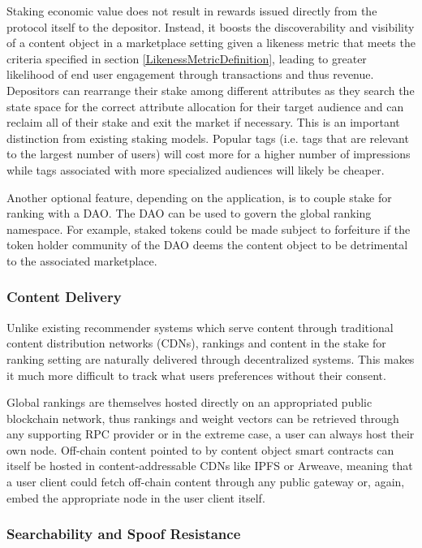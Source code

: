 Staking economic value does not result in rewards issued directly from the protocol itself to the depositor. Instead, it boosts the discoverability and visibility of a content object in a marketplace setting given a likeness metric that meets the criteria specified in section \ref{LikenessMetricDefinition}, leading to greater likelihood of end user engagement through transactions and thus revenue. Depositors can rearrange their stake among different attributes as they search the state space for the correct attribute allocation for their target audience and can reclaim all of their stake and exit the market if necessary. This is an important distinction from existing staking models. Popular tags (i.e. tags that are relevant to the largest number of users) will cost more for a higher number of impressions while tags associated with more specialized audiences will likely be cheaper.

Another optional feature, depending on the application, is to couple stake for ranking with a DAO. The DAO can be used to govern the global ranking namespace. For example, staked tokens could be made subject to forfeiture if the token holder community of the DAO deems the content object to be detrimental to the associated marketplace. 

\subsubsection{Content Delivery}

Unlike existing recommender systems which serve content through traditional content distribution networks (CDNs), rankings and content in the stake for ranking setting are naturally delivered through decentralized systems. This makes it much more difficult to track what users preferences without their consent. 

Global rankings are themselves hosted directly on an appropriated public blockchain network, thus rankings and weight vectors can be retrieved through any supporting RPC provider or in the extreme case, a user can always host their own node. Off-chain content pointed to by content object smart contracts can itself be hosted in content-addressable CDNs like IPFS or Arweave, meaning that a user client could fetch off-chain content through any public gateway or, again, embed the appropriate node in the user client itself. 

\subsubsection{Searchability and Spoof Resistance}

